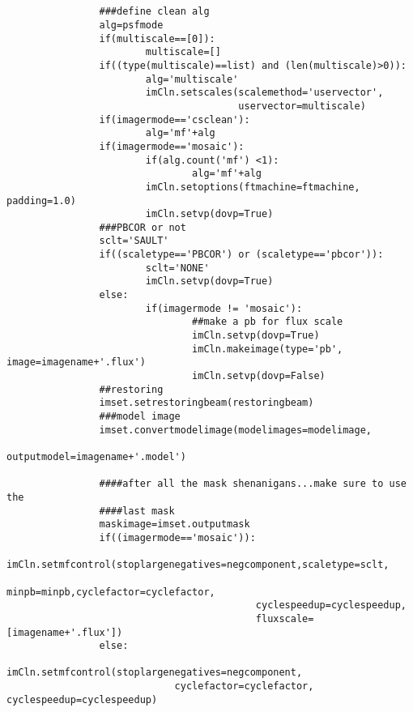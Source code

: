 \begin{verbatim}
                
                
                ###define clean alg
                alg=psfmode
                if(multiscale==[0]):
                        multiscale=[]
                if((type(multiscale)==list) and (len(multiscale)>0)):
                        alg='multiscale' 
                        imCln.setscales(scalemethod='uservector',
                                        uservector=multiscale)
                if(imagermode=='csclean'):
                        alg='mf'+alg
                if(imagermode=='mosaic'):
                        if(alg.count('mf') <1):
                                alg='mf'+alg
                        imCln.setoptions(ftmachine=ftmachine, padding=1.0)
                        imCln.setvp(dovp=True)
                ###PBCOR or not
                sclt='SAULT'
                if((scaletype=='PBCOR') or (scaletype=='pbcor')):
                        sclt='NONE'
                        imCln.setvp(dovp=True)
                else:
                        if(imagermode != 'mosaic'):
                                ##make a pb for flux scale
                                imCln.setvp(dovp=True)
                                imCln.makeimage(type='pb', image=imagename+'.flux')
                                imCln.setvp(dovp=False)
                ##restoring
                imset.setrestoringbeam(restoringbeam)
                ###model image
                imset.convertmodelimage(modelimages=modelimage,
                                        outputmodel=imagename+'.model')

                ####after all the mask shenanigans...make sure to use the
                ####last mask
                maskimage=imset.outputmask
                if((imagermode=='mosaic')):
                        imCln.setmfcontrol(stoplargenegatives=negcomponent,scaletype=sclt,
                                           minpb=minpb,cyclefactor=cyclefactor,
                                           cyclespeedup=cyclespeedup,
                                           fluxscale=[imagename+'.flux'])
                else:
                        imCln.setmfcontrol(stoplargenegatives=negcomponent,
                             cyclefactor=cyclefactor, cyclespeedup=cyclespeedup)
                        

\end{verbatim}
